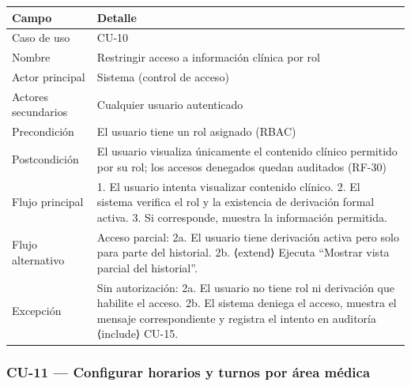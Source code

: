 \documentclass[11pt,a4paper]{article}
\begin{document}
	\begin{longtable}{p{} p{} }
		
		
		\toprule
		\textbf{Campo} &
		\textbf{Detalle}  \\
		\midrule
		\endhead
		
		Caso de uso & CU-10 \\
		Nombre & Restringir acceso a información clínica por rol \\
		Actor principal & Sistema (control de acceso) \\
		Actores secundarios & Cualquier usuario autenticado \\
		Precondición & El usuario tiene un rol asignado (RBAC) \\
		Postcondición & El usuario visualiza únicamente el contenido clínico permitido por su rol; los accesos denegados quedan auditados (RF-30) \\
		Flujo principal & 1. El usuario intenta visualizar contenido clínico. 2. El sistema verifica el rol y la existencia de derivación formal activa. 3. Si corresponde, muestra la información permitida. \\
		Flujo alternativo & Acceso parcial: 2a. El usuario tiene derivación activa pero solo para parte del historial. 2b. ⟨extend⟩ Ejecuta ``Mostrar vista parcial del historial''. \\
		Excepción & Sin autorización: 2a. El usuario no tiene rol ni derivación que habilite el acceso. 2b. El sistema deniega el acceso, muestra el mensaje correspondiente y registra el intento en auditoría ⟨include⟩ CU-15. \\
		\bottomrule
	\end{longtable}
	
	\subsubsection{CU-11 --- Configurar horarios y turnos por área médica}
	
\end{document}
